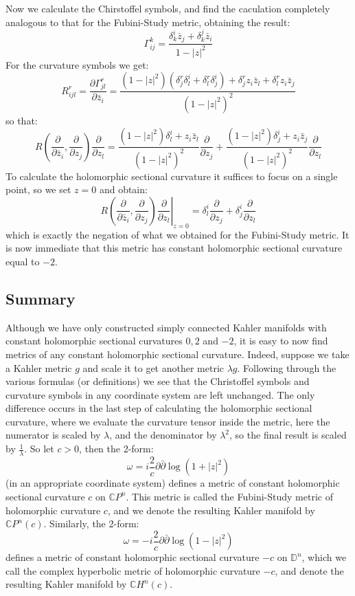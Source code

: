 \documentclass[11pt]{amsart}
\theoremstyle{definition}
\def \CP{ \mathbb{C}P }
\def \CH{ \mathbb{C}H }
\def \del{ \partial }
\def \delbar{ \bar{\partial} }
\def \disk{ \mathbb{D} }
\begin{document}
Now we calculate the Chirstoffel symbols, and find the caculation completely analogous to that for the Fubini-Study metric, obtaining the result:
%
$$ \Gamma_{ij}^k = \frac{ \delta^i_k \bar{z}_j + \delta^j_k \bar{z}_i }{ 1 - |z|^2 } $$
%
For the curvature symbols we get:
%
$$ R_{ijl}^r = \frac{ \del \Gamma_{jl}^r }{ \del \bar{z}_i } = \frac{ ( 1 - |z|^2 )( \delta^r_j \delta^i_l + \delta^r_l \delta^i_j ) + \delta^r_j z_i \bar{z}_l + \delta^r_l z_i \bar{z}_j }{ ( 1 - |z|^2 )^2 } $$
%
so that:
%
$$ R \left( \frac{ \del }{ \del \bar{z}_i },\frac{ \del }{ \del z_j } \right) \frac{ \del }{ \del z_l } = \frac{ ( 1 - |z|^2 ) \delta^i_l + z_i \bar{z}_l }{ (1 - |z|^2)^2 } \frac{ \del }{ \del z_j } + \frac{ ( 1 - |z|^2 ) \delta^i_j + z_i \bar{z}_j }{ (1 - |z|^2)^2 } \frac{ \del }{ \del z_l } $$
%
To calculate the holomorphic sectional curvature it suffices to focus on a single point, so we set $z=0$ and obtain:
%
$$  \left. R \left( \frac{ \del }{ \del \bar{z}_i },\frac{ \del }{ \del z_j } \right) \frac{ \del }{ \del z_l } \right|_{z=0} =  \delta^i_l \frac{ \del }{ \del z_j } + \delta^i_j \frac{ \del }{ \del z_l } $$
%
which is exactly the negation of what we obtained for the Fubini-Study metric.  It is now immediate that this metric has constant holomorphic sectional curvature equal to $-2$.

\subsection{ Summary }  
Although we have only constructed simply connected Kahler manifolds with constant holomorphic sectional curvatures $0,2$ and $-2$, it is easy to now find metrics of any constant holomorphic sectional curvature.  Indeed, suppose we take a Kahler metric $g$ and scale it to get another metric $\lambda g$.  Following through the various formulas (or definitions) we see that the Christoffel symbols and curvature symbols in any coordinate system are left unchanged.  The only difference occurs in the last step of calculating the holomorphic sectional curvature, where we evaluate the curvature tensor inside the metric, here the numerator is scaled by $\lambda$, and the denominator by $\lambda^2$, so the final result is scaled by $\frac{1}{\lambda}$.  So let $c > 0$, then the 2-form:
%
$$ \omega = i \frac{2}{c} \del \delbar \log ( 1 + |z|^2 ) $$
%
(in an appropriate coordinate system) defines a metric of constant holomorphic sectional curvature $c$ on $\CP^n$.  This metric is called the Fubini-Study metric of holomorphic curvature $c$, and we denote the resulting Kahler manifold by $\CP^n(c)$.  Similarly, the 2-form:
%
$$ \omega = - i \frac{2}{c} \del \delbar \log ( 1 - |z|^2 ) $$
%
defines a metric of constant holomorphic sectional curvature $-c$ on $\disk^n$, which we call the complex hyperbolic metric of holomorphic curvature $-c$, and denote the resulting Kahler manifold by $\CH^n (c)$.
\end{document}
